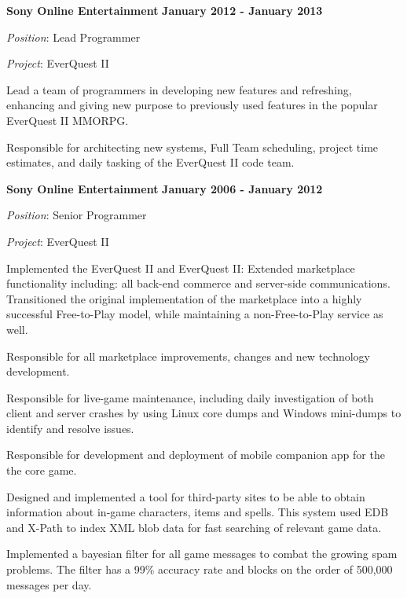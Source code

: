 \documentclass{article}
\begin{document}
\vspace{\baselineskip}
{\bf Sony Online Entertainment}
\hfill {\bf January 2012 - January 2013}
\vspace{.03in}
\par
{\it Position}: Lead Programmer
\par
{\it Project}: EverQuest II
\vspace{\baselineskip}
\par
Lead a team of programmers in developing new features and
refreshing, enhancing and giving new purpose to previously used features in
the popular EverQuest II MMORPG. 
\par
Responsible for architecting new systems, Full Team
scheduling, project time estimates, and daily tasking of the EverQuest II code team.
\par
\vspace{\baselineskip}
{\bf Sony Online Entertainment} 
\hfill {\bf January 2006 - January 2012} 
\par
\vspace{.03in}
{\it Position}: Senior Programmer
\par
{\it Project}: EverQuest II
\vspace{\baselineskip}
\par
Implemented the EverQuest II and EverQuest II: Extended marketplace functionality
including: all back-end commerce and server-side communications.  Transitioned
the original implementation of the marketplace into a highly successful Free-to-Play 
model, while maintaining a non-Free-to-Play service as well.
\par
Responsible for all marketplace improvements, changes and new technology
development. 
\par
Responsible for live-game maintenance, including daily investigation of both client
and server crashes by using Linux core dumps and Windows mini-dumps to identify
and resolve issues. 
\par
Responsible for development and deployment of mobile companion app for the the core game.
\par

\vspace{\baselineskip}
Designed and implemented a tool for third-party sites to be able to obtain
information about in-game characters, items and spells.  This system used 
EDB and X-Path to index XML blob data for fast searching of relevant game data.
\par

\vspace{\baselineskip}
Implemented a bayesian filter for all game messages to combat the growing spam
problems.  The filter has a 99\% accuracy rate and blocks on the order of
500,000 messages per day.
\par
\end{document}
